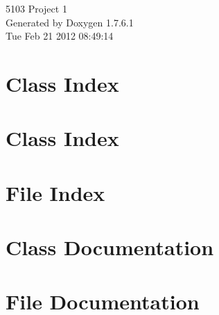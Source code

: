 \documentclass[a4paper]{book}
\begin{document}
\hypersetup{pageanchor=false,citecolor=blue}
\begin{titlepage}
\vspace*{7cm}
\begin{center}
{\Large 5103 \-Project 1 }\\
\vspace*{1cm}
{\large \-Generated by Doxygen 1.7.6.1}\\
\vspace*{0.5cm}
{\small Tue Feb 21 2012 08:49:14}\\
\end{center}
\end{titlepage}
\clearemptydoublepage
{}
\tableofcontents
\clearemptydoublepage
{}
\hypersetup{pageanchor=true,citecolor=blue}
\chapter{\-Class \-Index}

\chapter{\-Class \-Index}

\chapter{\-File \-Index}

\chapter{\-Class \-Documentation}




















\chapter{\-File \-Documentation}













\printindex
\end{document}
